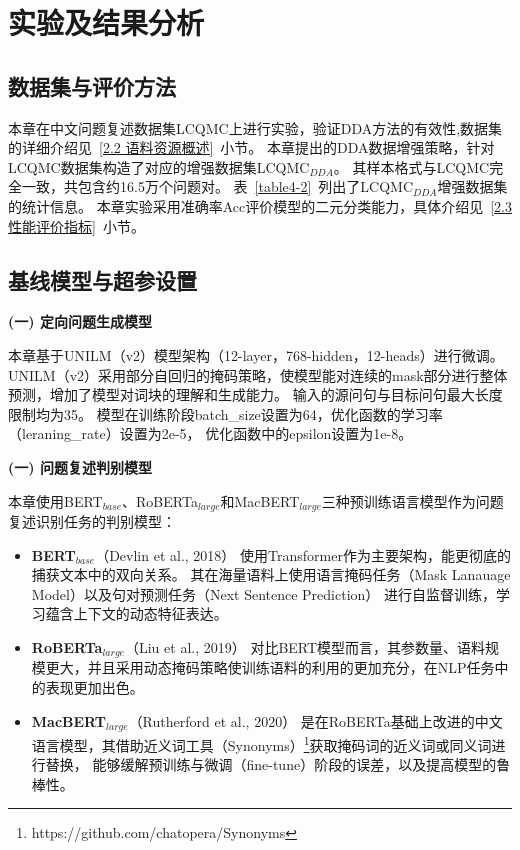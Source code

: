 \section{实验及结果分析}

\subsection{数据集与评价方法}

本章在中文问题复述数据集LCQMC上进行实验，验证DDA方法的有效性,数据集的详细介绍见~\ref{2.2 语料资源概述}~小节。
本章提出的DDA数据增强策略，针对LCQMC数据集构造了对应的增强数据集LCQMC$_{DDA}$。
其样本格式与LCQMC完全一致，共包含约16.5万个问题对。
表~\ref{table4-2}~列出了LCQMC$_{DDA}$增强数据集的统计信息。
本章实验采用准确率Acc评价模型的二元分类能力，具体介绍见~\ref{2.3 性能评价指标}~小节。



\subsection{基线模型与超参设置}

\textbf{(一) 定向问题生成模型}

本章基于UNILM（v2）模型架构（12-layer，768-hidden，12-heads）进行微调。
UNILM（v2）采用部分自回归的掩码策略，使模型能对连续的mask部分进行整体预测，增加了模型对词块的理解和生成能力。
输入的源问句与目标问句最大长度限制均为35。
模型在训练阶段batch\_size设置为64，优化函数的学习率（leraning\_rate）设置为2e-5，
优化函数中的epsilon\cite{rutherford2002lecture}设置为1e-8。

\textbf{(一) 问题复述判别模型}

本章使用BERT$_{base}$、RoBERTa$_{large}$和MacBERT$_{large}$三种预训练语言模型作为问题复述识别任务的判别模型：
\begin{itemize}
    \item \textbf{BERT$_{base}$}（Devlin et al., 2018）\cite{devlin2018bert}
    使用Transformer作为主要架构，能更彻底的捕获文本中的双向关系。
    其在海量语料上使用语言掩码任务（Mask Lanauage Model）以及句对预测任务（Next Sentence Prediction）
    进行自监督训练，学习蕴含上下文的动态特征表达。
    \item \textbf{RoBERTa$_{large}$}（Liu et al., 2019）\cite{liu2019roberta}
    对比BERT模型而言，其参数量、语料规模更大，并且采用动态掩码策略使训练语料的利用的更加充分，在NLP任务中的表现更加出色。
    \item \textbf{MacBERT$_{large}$}（Rutherford et al., 2020）\cite{cui2020revisiting}
    是在RoBERTa基础上改进的中文语言模型，其借助近义词工具（Synonyms）\footnote{https://github.com/chatopera/Synonyms}获取掩码词的近义词或同义词进行替换，
    能够缓解预训练与微调（fine-tune）阶段的误差，以及提高模型的鲁棒性。
\end{itemize}

